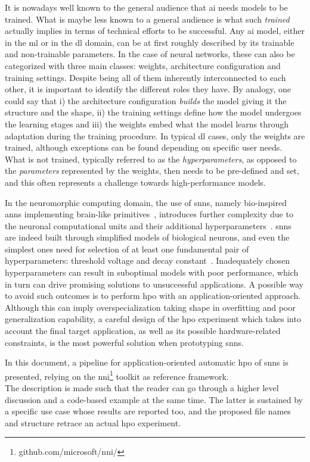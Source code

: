 It is nowadays well known to the general audience that \gls{ai} needs models to be trained. What is maybe less known to a general audience is what such \emph{trained} actually implies in terms of technical efforts to be successful.
Any \gls{ai} model, either in the \gls{ml} or in the \gls{dl} domain, can be at first roughly described by its trainable and non-trainable parameters.
In the case of neural networks, these can also be categorized with three main classes: weights, architecture configuration and training settings.
Despite being all of them inherently interconnected to each other, it is important to identify the different roles they have. By analogy, one could say that i) the architecture configuration \emph{builds} the model giving it the structure and the shape, ii) the training settings define how the model undergoes the learning stages and iii) the weights embed what the model learns through adaptation during the training procedure.
In typical \gls{dl} cases, only the weights are trained, although exceptions can be found depending on specific user needs.
What is not trained, typically referred to as the \emph{hyperparameters}, as opposed to the \emph{parameters} represented by the weights, then needs to be pre-defined and set, and this often represents a challenge towards high-performance models\cite{liao_empirical_2022}.

In the neuromorphic computing domain, the use of \glspl{snn}, namely bio-inspired \glspl{ann} implementing brain-like primitives~\cite{Maass1997}, introduces further complexity due to the neuronal computational units and their additional hyperparameters~\cite{firmin_parallel_2024}.
\glspl{snn} are indeed built through simplified models of biological neurons, and even the simplest ones need for selection of at least one fundamental pair of hyperparameters: threshold voltage and decay constant~\cite{ou_overview_2022,ganguly_spike_2024}.
Inadequately chosen hyperparameters can result in suboptimal models with poor performance, which in turn can drive promising solutions to unsuccessful applications.
A possible way to avoid such outcomes is to perform \gls{hpo} with an application-oriented approach.
Although this can imply overspecialization taking shape in overfitting and poor generalization capability, a careful design of the \gls{hpo} experiment which takes into account the final target application, as well as its possible hardware-related constraints, is the most powerful solution when prototyping \glspl{snn}.

In this document, a pipeline for application-oriented automatic \gls{hpo} of \glspl{snn} is presented, relying on the \gls{nni}\footnote{github.com/microsoft/nni/} toolkit as reference framework.\\
The description is made such that the reader can go through a higher level discussion and a code-based example at the same time. The latter is sustained by a specific use case whose results are reported too, and the proposed file names and structure retrace an actual \gls{hpo} experiment.


